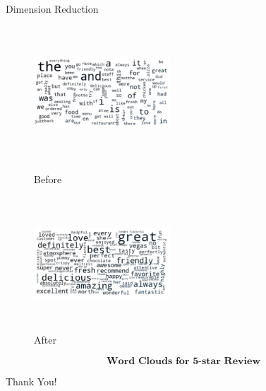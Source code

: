 \documentclass[10pt]{beamer}
\begin{document}
\begin{frame}{Dimension Reduction}
\begin{figure}[htbp]
\centering
\begin{minipage}[t]{0.48\textwidth}
\centering
\includegraphics[width=5.1cm,height=5cm]{dist5_ori.png}
\caption{Before}
\end{minipage}
\begin{minipage}[t]{0.48\textwidth}
\centering
\includegraphics[width=5.1cm,height=5cm]{dist5.png}
\caption{After}
\end{minipage}
\end{figure}
$$\textbf{Word Clouds for 5-star Review}$$   
\end{frame}

\begin{frame}
\Huge{\centerline{Thank You!}}
\end{frame}
\end{document}
